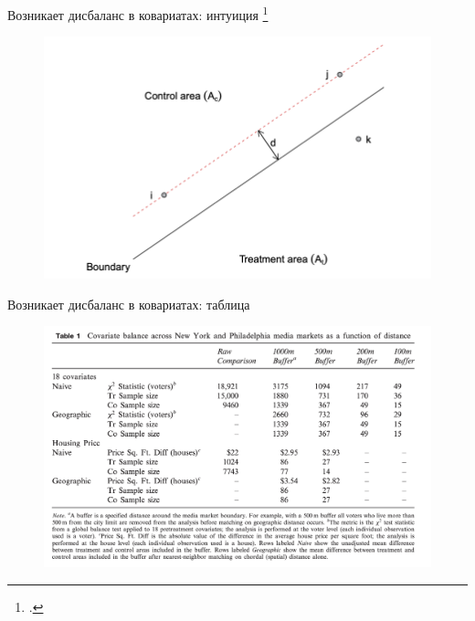 \begin{frame}{Возникает дисбаланс в ковариатах: интуиция \footcitetext[Картника и пример из ][]{keele2015geographic}}
    \begin{figure}
        \centering
        \includegraphics[width=\textwidth]{Images/pool bad.png}
    \end{figure}
\end{frame}



\begin{frame}{Возникает дисбаланс в ковариатах: таблица}
    \begin{figure}
        \centering
        \includegraphics[width=\textwidth]{Images/geo_balance.png}
    \end{figure}
\end{frame}


